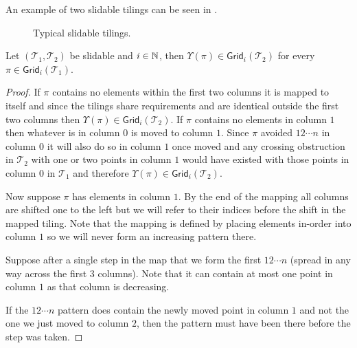 \begin{definition}
\begin{itemize}
\end{itemize}
\end{definition}

An example of two slidable tilings can be seen in .

\begin{figure}[ht]
    \centering
    
    \caption{Typical slidable tilings.}
    \label{fig:slidable_tilings}
\end{figure}

\begin{lemma}\label{lem:slidemap}
Let $(\mathcal{T}_1,\mathcal{T}_2)$ be slidable and $i \in \mathbb{N}$, then $\Upsilon(\pi) \in \textsf{Grid}_i(\mathcal{T}_2)$ for every $\pi \in \textsf{Grid}_i(\mathcal{T}_1)$.
\end{lemma}
\begin{proof}
If $\pi$ contains no elements within the first two columns it is mapped to itself and since the tilings share requirements and are identical outside the first two columns then $\Upsilon(\pi) \in \textsf{Grid}_i(\mathcal{T}_2)$. If $\pi$ contains no elements in column $1$ then whatever is in column $0$ is moved to column $1$. Since $\pi$ avoided $12\dotsm n$ in column $0$ it will also do so in column $1$ once moved and any crossing obstruction in $\mathcal{T}_2$ with one or two points in column $1$ would have existed with those points in column $0$ in $\mathcal{T}_1$ and therefore $\Upsilon(\pi) \in \textsf{Grid}_i(\mathcal{T}_2)$.

Now suppose $\pi$ has elements in column $1$. By the end of the mapping all columns are shifted one to the left but we will refer to their indices before the shift in the mapped tiling. Note that the mapping is defined by placing elements in-order into column $1$ so we will never form an increasing pattern there. 

Suppose after a single step in the map that we form the first $12\cdots n$ (spread in any way across the first $3$ columns). Note that it can contain at most one point in column $1$ as that column is decreasing.

If the $12\cdots n$ pattern does contain the newly moved point in column $1$ and not the one we just moved to column $2$, then the pattern must have been there before the step was taken.


\end{proof}
